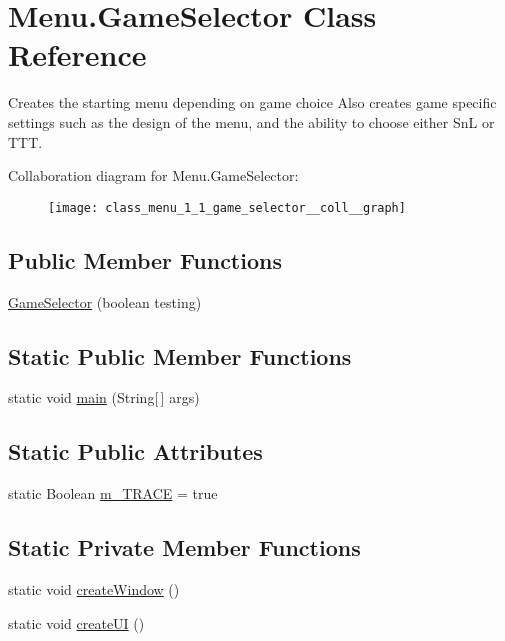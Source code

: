 \hypertarget{class_menu_1_1_game_selector}{}\section{Menu.\+Game\+Selector Class Reference}
\label{class_menu_1_1_game_selector}


Creates the starting menu depending on game choice Also creates game specific settings such as the design of the menu, and the ability to choose either Sn\+L or T\+T\+T.  




Collaboration diagram for Menu.\+Game\+Selector\+:
\nopagebreak
\begin{figure}[H]
\begin{center}
\leavevmode
\texttt{[image: class\_menu\_1\_1\_game\_selector\_\_coll\_\_graph]}
\end{center}
\end{figure}
\subsection*{Public Member Functions}
\begin{DoxyCompactItemize}
\item 
\hyperlink{class_menu_1_1_game_selector_adbafa9df1cdafc14b39cb120c6ee649a}{Game\+Selector} (boolean testing)
\end{DoxyCompactItemize}
\subsection*{Static Public Member Functions}
\begin{DoxyCompactItemize}
\item 
static void \hyperlink{class_menu_1_1_game_selector_acc61bbafb5fd894b403d5e0826ef2030}{main} (String\mbox{[}$\,$\mbox{]} args)
\end{DoxyCompactItemize}
\subsection*{Static Public Attributes}
\begin{DoxyCompactItemize}
\item 
static Boolean \hyperlink{class_menu_1_1_game_selector_a2eb9bf5de7be21be696db9228f4bff0f}{m\+\_\+\+T\+R\+A\+C\+E} = true
\end{DoxyCompactItemize}
\subsection*{Static Private Member Functions}
\begin{DoxyCompactItemize}
\item 
static void \hyperlink{class_menu_1_1_game_selector_a657e217de86042e8190a28fdde3eac9d}{create\+Window} ()
\item 
static void \hyperlink{class_menu_1_1_game_selector_afabfb42f9fedc64129e47d68ef0f7b4d}{create\+U\+I} ()
\end{DoxyCompactItemize}
